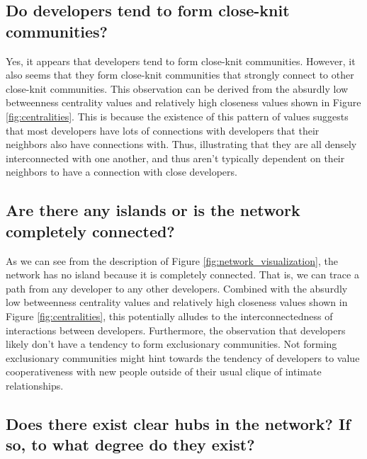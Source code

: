 \documentclass[9pt,twocolumn,twoside]{pnas-new}
\begin{document}
\subsection{Do developers tend to form close-knit communities?}

Yes, it appears that developers tend to form close-knit communities. However, it also seems that they form close-knit communities that strongly connect to other close-knit communities. This observation can be derived from the absurdly low betweenness centrality values and relatively high closeness values shown in Figure \ref{fig:centralities}. This is because the existence of this pattern of values suggests that most developers have lots of connections with developers that their neighbors also have connections with. Thus, illustrating that they are all densely interconnected with one another, and thus aren't typically dependent on their neighbors to have a connection with close developers.

\subsection{Are there any islands or is the network completely connected?}

As we can see from the description of Figure \ref{fig:network_visualization}, the network has no island because it is completely connected. That is, we can trace a path from any developer to any other developers. Combined with the absurdly low betweenness centrality values and relatively high closeness values shown in Figure \ref{fig:centralities}, this potentially alludes to the interconnectedness of interactions between developers. Furthermore, the observation that developers likely don't have a tendency to form exclusionary communities. Not forming exclusionary communities might hint towards the tendency of developers to value cooperativeness with new people outside of their usual clique of intimate relationships.

\subsection{Does there exist clear hubs in the network? If so, to what degree do they exist?}
\end{document}
